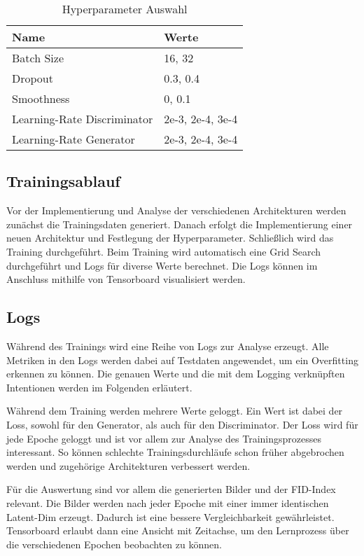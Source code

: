 \begin{table}[H]
	\centering
	\label{table:hyperparameter}
	\begin{tabular}{l l}
		Name                        & Werte            \\ \hline
		Batch Size                  & 16, 32           \\
		Dropout                     & 0.3, 0.4         \\
		Smoothness                  & 0, 0.1           \\
		Learning-Rate Discriminator & 2e-3, 2e-4, 3e-4 \\
		Learning-Rate Generator     & 2e-3, 2e-4, 3e-4
	\end{tabular}
	\caption{Hyperparameter Auswahl}
\end{table}

\subsection{Trainingsablauf}
Vor der Implementierung und Analyse der verschiedenen Architekturen werden zunächst die Trainingsdaten generiert.
Danach erfolgt die Implementierung einer neuen Architektur und Festlegung der Hyperparameter.
Schließlich wird das Training durchgeführt.
Beim Training wird automatisch eine Grid Search durchgeführt und Logs für diverse Werte berechnet.
Die Logs können im Anschluss mithilfe von Tensorboard visualisiert werden.

\subsection{Logs}
Während des Trainings wird eine Reihe von Logs zur Analyse erzeugt.
Alle Metriken in den Logs werden dabei auf Testdaten angewendet, um ein Overfitting erkennen zu können.
Die genauen Werte und die mit dem Logging verknüpften Intentionen werden im Folgenden erläutert.
\newline

Während dem Training werden mehrere Werte geloggt.
Ein Wert ist dabei der Loss, sowohl für den Generator, als auch für den Discriminator.
Der Loss wird für jede Epoche geloggt und ist vor allem zur Analyse des Trainingsprozesses interessant.
So können schlechte Trainingsdurchläufe schon früher abgebrochen werden und zugehörige Architekturen verbessert werden.
\newline

Für die Auswertung sind vor allem die generierten Bilder und der \acrshort{FID}-Index relevant.
Die Bilder werden nach jeder Epoche mit einer immer identischen Latent-Dim erzeugt.
Dadurch ist eine bessere Vergleichbarkeit gewährleistet.
Tensorboard erlaubt dann eine Ansicht mit Zeitachse, um den Lernprozess über die verschiedenen Epochen beobachten zu können.
\newline

